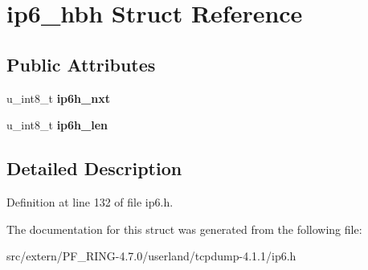\hypertarget{structip6__hbh}{
\section{ip6\_\-hbh Struct Reference}
\label{structip6__hbh}
}
\subsection*{Public Attributes}
\begin{DoxyCompactItemize}
\item 
\hypertarget{structip6__hbh_a52f374999a5060f5e24991eccac9881b}{
u\_\-int8\_\-t {\bfseries ip6h\_\-nxt}}
\label{structip6__hbh_a52f374999a5060f5e24991eccac9881b}

\item 
\hypertarget{structip6__hbh_adcbdf329f5cf5ac43c19e250a3444c3b}{
u\_\-int8\_\-t {\bfseries ip6h\_\-len}}
\label{structip6__hbh_adcbdf329f5cf5ac43c19e250a3444c3b}

\end{DoxyCompactItemize}


\subsection{Detailed Description}


Definition at line 132 of file ip6.h.



The documentation for this struct was generated from the following file:\begin{DoxyCompactItemize}
\item 
src/extern/PF\_\-RING-\/4.7.0/userland/tcpdump-\/4.1.1/ip6.h\end{DoxyCompactItemize}
